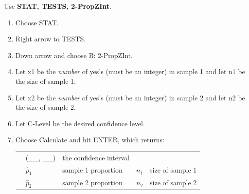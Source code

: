 \begin{termBox}{
Use \textbf{STAT, TESTS, 2-PropZInt}.
\begin{enumerate}
\setlength{\itemsep}{0mm}
\item Choose STAT.
\item Right arrow to TESTS.
\item Down arrow and choose B: 2-PropZInt.
\item Let x1 be the \emph{number} of yes's (must be an integer) in sample 1 and let n1 be the size of sample 1.
\item Let x2 be the \emph{number} of yes's (must be an integer) in sample 2 and let n2 be the size of sample 2.
\item Let C-Level be the desired confidence level.
\item Choose Calculate and hit ENTER, which returns: \\
\begin{tabular}{l ll ll}
\hspace{3mm}&
(\underline{\ \ \ }, \underline{\ \ \ })
	&\quad  the confidence interval \\
&
$\hat{p}_1$
	&\quad  sample 1 proportion
	&\quad	$n_1$
	&\quad  size of sample 1 \\
&
$\hat{p}_2$
	&\quad  sample 2 proportion
	&\quad	$n_2$
	&\quad  size of sample 2
\end{tabular}
\end{enumerate}
}
\end{termBox}

